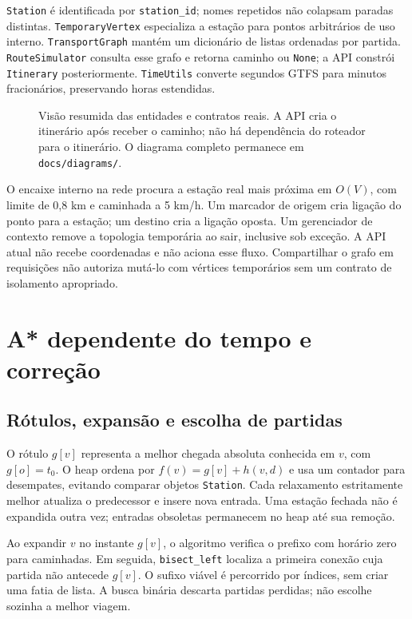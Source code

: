 \documentclass[12pt]{article}
\newcommand{\code}[1]{\texttt{#1}}
\begin{document}
\code{Station} é identificada por \code{station\_id}; nomes repetidos não colapsam paradas distintas. \code{TemporaryVertex} especializa a estação para pontos arbitrários de uso interno. \code{TransportGraph} mantém um dicionário de listas ordenadas por partida. \code{RouteSimulator} consulta esse grafo e retorna caminho ou \code{None}; a API constrói \code{Itinerary} posteriormente. \code{TimeUtils} converte segundos GTFS para minutos fracionários, preservando horas estendidas.

\begin{figure}[ht]
\centering

\caption{Visão resumida das entidades e contratos reais. A API cria o itinerário após receber o caminho; não há dependência do roteador para o itinerário. O diagrama completo permanece em \texttt{docs/diagrams/}.}
\label{fig:classes}
\end{figure}

O encaixe interno na rede procura a estação real mais próxima em $O(V)$, com limite de 0,8 km e caminhada a 5 km/h. Um marcador de origem cria ligação do ponto para a estação; um destino cria a ligação oposta. Um gerenciador de contexto remove a topologia temporária ao sair, inclusive sob exceção. A API atual não recebe coordenadas e não aciona esse fluxo. Compartilhar o grafo em requisições não autoriza mutá-lo com vértices temporários sem um contrato de isolamento apropriado.

\section{A* dependente do tempo e correção}
\subsection{Rótulos, expansão e escolha de partidas}
O rótulo $g[v]$ representa a melhor chegada absoluta conhecida em $v$, com $g[o]=t_0$. O heap ordena por $f(v)=g[v]+h(v,d)$ e usa um contador para desempates, evitando comparar objetos \code{Station}. Cada relaxamento estritamente melhor atualiza o predecessor e insere nova entrada. Uma estação fechada não é expandida outra vez; entradas obsoletas permanecem no heap até sua remoção.

Ao expandir $v$ no instante $g[v]$, o algoritmo verifica o prefixo com horário zero para caminhadas. Em seguida, \code{bisect\_left} localiza a primeira conexão cuja partida não antecede $g[v]$. O sufixo viável é percorrido por índices, sem criar uma fatia de lista. A busca binária descarta partidas perdidas; não escolhe sozinha a melhor viagem.
\end{document}
